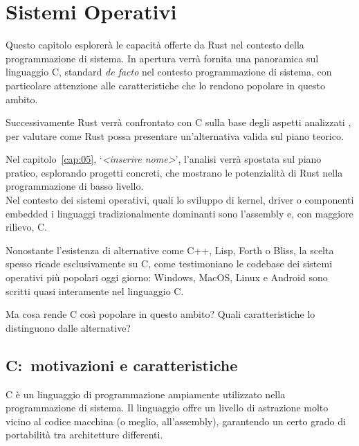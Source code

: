 
\chapter{Sistemi Operativi}\label{cap:04}

Questo capitolo esplorerà le capacità offerte da Rust nel 
contesto della programmazione di sistema. In apertura verrà
fornita una panoramica sul linguaggio C, standard \textit{de facto}
nel contesto programmazione di sistema, con particolare attenzione alle 
 caratteristiche che lo rendono popolare in questo ambito.

Successivamente Rust verrà confrontato con C sulla base degli aspetti analizzati
, per valutare come Rust possa presentare un'alternativa valida sul piano teorico.

Nel capitolo~\ref{cap:05}, `\textit{<inserire nome>}', l'analisi verrà spostata sul piano pratico, 
esplorando progetti concreti, che mostrano le potenzialità di Rust nella programmazione di basso livello. \hfill
\vspace{20pt}\\
\noindent Nel contesto dei sistemi operativi, quali lo sviluppo di kernel, driver o componenti embedded i linguaggi tradizionalmente dominanti
 sono l'assembly e, con maggiore rilievo, C.

Nonostante l'esistenza di alternative come C++, Lisp, Forth o Bliss, la scelta spesso ricade esclusivamente
su C, come testimoniano le codebase dei sistemi operativi più popolari oggi giorno: Windows, MacOS, Linux e Android sono scritti quasi interamente nel linguaggio C.

Ma cosa rende C così popolare in questo ambito? Quali caratteristiche lo distinguono dalle alternative?

\section{C:\  motivazioni e caratteristiche}
C è un linguaggio di programmazione ampiamente utilizzato nella 
programmazione di sistema. Il linguaggio offre un livello
di astrazione molto vicino al codice macchina (o meglio, 
all'assembly), garantendo un certo grado di portabilità 
tra architetture differenti.

